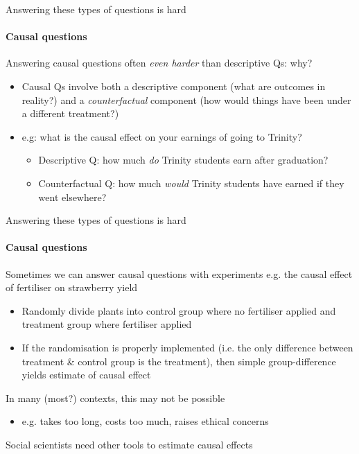 \documentclass[11pt,english]{beamer}
\begin{document}
\begin{frame}{Answering these types of questions is hard}
\framesubtitle{Causal questions}
	Answering causal questions often \textit{even harder} than descriptive Qs: why?	
	\pause
	\begin{itemize}
		\item Causal Qs involve both a descriptive component (what are outcomes in reality?) 
		\pause and a \textit{counterfactual} component (how would things have been under a different treatment?)
		
		\pause
		\item e.g: what is the causal effect on your earnings of going to Trinity? 
			\begin{itemize}
				\pause 
				\item Descriptive Q: how much \textit{do} Trinity students earn after graduation?
				\pause 
				\item Counterfactual Q: how much \textit{would} Trinity students have earned if they went elsewhere?  
			\end{itemize}
	\end{itemize}	
\end{frame}

\begin{frame}{Answering these types of questions is hard}
\framesubtitle{Causal questions}

	Sometimes we can answer causal questions with experiments
	\pause 
	e.g. the causal effect of fertiliser on strawberry yield
	\pause 
	\begin{itemize}
		\item Randomly divide plants into control group where no fertiliser applied and treatment group where fertiliser applied
		\pause 
		\item If the randomisation is properly implemented (i.e. the only difference between treatment \& control group is the treatment), then simple group-difference yields estimate of causal effect  	
	\end{itemize}
	\pause 
	\vspace{0.25cm}

	In many (most?) contexts, this may not be possible \pause 
	\begin{itemize}
		\item e.g. takes too long, costs too much, raises ethical concerns
	\end{itemize}
	\vspace{0.25cm}
	\pause 

	Social scientists need other tools to estimate causal effects

\end{frame}
\end{document}
